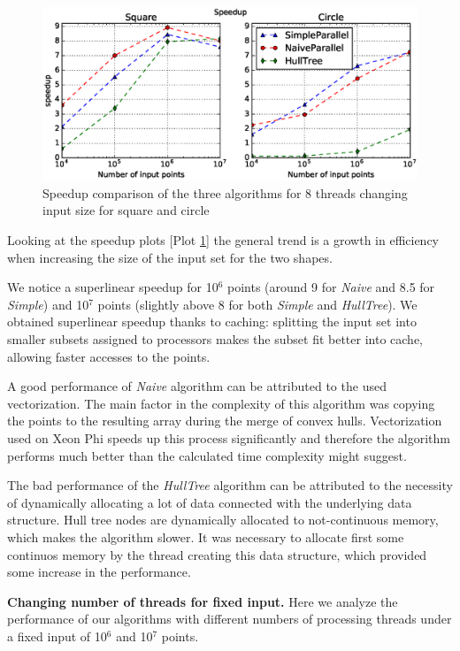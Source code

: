 \documentclass[letterpaper]{article}
\newcommand{\mypar}[1]{{\bf #1.}}
\theoremstyle{definition}
\begin{document}
\begin{figure}[!ht]\centering
  \includegraphics[scale=0.33]{./plots/speedup_points.eps}
  \caption{Speedup comparison of the three algorithms for 8 threads changing input size for square and circle\label{Input size speedup}}
\end{figure}

Looking at the speedup plots [Plot \ref{Input size speedup}] the general trend is a growth in efficiency when increasing the size of the input set for the two shapes.

We notice a superlinear speedup for 10$^6$ points (around 9 for \textit{Naive} and 8.5 for \textit{Simple}) and 10$^7$ points (slightly above 8 for both \textit{Simple} and \textit{HullTree}).
We obtained superlinear speedup thanks to caching: splitting the input set into smaller subsets assigned to processors makes the subset fit better into cache, allowing faster accesses to the points.

A good performance of \textit{Naive} algorithm can be attributed to the used vectorization.
The main factor in the complexity of this algorithm was copying the points to the resulting array during the merge of convex hulls.
Vectorization used on Xeon Phi speeds up this process significantly and therefore the algorithm performs much better than the calculated time complexity might suggest.

The bad performance of the \textit{HullTree} algorithm can be attributed to the necessity of dynamically allocating a lot of data connected with the underlying data structure.
Hull tree nodes are dynamically allocated to not-continuous memory, which makes the algorithm slower.
It was necessary to allocate first some continuos memory by the thread creating this data structure, which provided some increase in the performance.

\mypar{Changing number of threads for fixed input}
Here we analyze the performance of our algorithms with different numbers of processing threads under a fixed input of 10$^6$ and 10$^7$ points.
\end{document}
